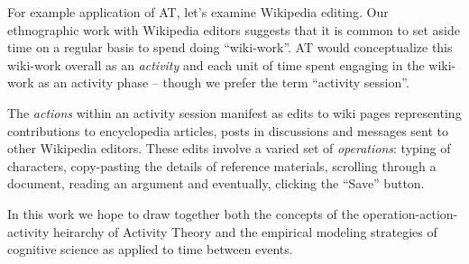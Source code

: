 For example application of AT, let's examine Wikipedia editing.  Our ethnographic work with Wikipedia editors suggests that it is common to set aside time on a regular basis to spend doing ``wiki-work''.  AT would conceptualize this wiki-work overall as an \emph{activity} and each unit of time spent engaging in the wiki-work as an activity phase -- though we prefer the term ``activity session''.

The \emph{actions} within an activity session manifest as edits to wiki pages representing contributions to encyclopedia articles, posts in discussions and messages sent to other Wikipedia editors.  These edits involve a varied set of \emph{operations}: typing of characters, copy-pasting the details of reference materials, scrolling through a document, reading an argument and eventually, clicking the ``Save'' button.

In this work we hope to draw together both the concepts of the operation-action-activity heirarchy of Activity Theory and the empirical modeling strategies of cognitive science as applied to time between events.
